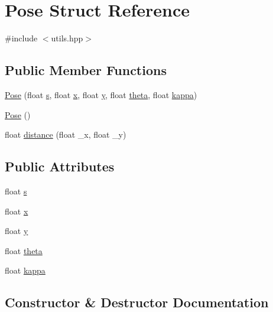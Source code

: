\hypertarget{structPose}{}\section{Pose Struct Reference}
\label{structPose}


{\ttfamily \#include $<$utils.\+hpp$>$}

\subsection*{Public Member Functions}
\begin{DoxyCompactItemize}
\item 
\hyperlink{structPose_a80c8e028bf0a6d815db4bbd599877f22}{Pose} (float \hyperlink{structPose_a7cafd5a1122c053e9c1ddec351dbb8f3}{s}, float \hyperlink{structPose_a2f30fe76d6747d973daff013207ca0e8}{x}, float \hyperlink{structPose_a60610dad0457edf9e1c57a787b68b632}{y}, float \hyperlink{structPose_a2e2edc8448a8f6f4a21cbd7eca63c2ff}{theta}, float \hyperlink{structPose_a4f409e1fe4ae5626042bc2942df9367a}{kappa})
\item 
\hyperlink{structPose_a8a4171c8a6b09e37fb011997da9ea2ad}{Pose} ()
\item 
float \hyperlink{structPose_a2032faa5456e2d667bac87f7f8921020}{distance} (float \+\_\+x, float \+\_\+y)
\end{DoxyCompactItemize}
\subsection*{Public Attributes}
\begin{DoxyCompactItemize}
\item 
float \hyperlink{structPose_a7cafd5a1122c053e9c1ddec351dbb8f3}{s}
\item 
float \hyperlink{structPose_a2f30fe76d6747d973daff013207ca0e8}{x}
\item 
float \hyperlink{structPose_a60610dad0457edf9e1c57a787b68b632}{y}
\item 
float \hyperlink{structPose_a2e2edc8448a8f6f4a21cbd7eca63c2ff}{theta}
\item 
float \hyperlink{structPose_a4f409e1fe4ae5626042bc2942df9367a}{kappa}
\end{DoxyCompactItemize}


\subsection{Constructor \& Destructor Documentation}
